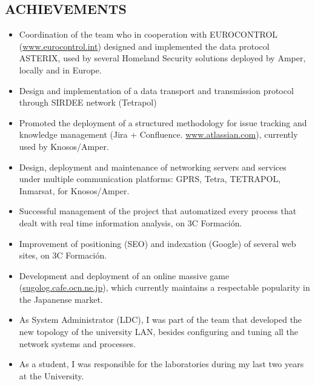 \documentclass[line,margin]{res}
\begin{document}
\begin{resume}
\section{ACHIEVEMENTS}   
                \begin{itemize}  \itemsep 2pt %
                \item Coordination of the team who in cooperation with EUROCONTROL
                (\url{www.eurocontrol.int}) designed and implemented the data
                protocol ASTERIX, used by several Homeland Security solutions 
                deployed by Amper, locally and in Europe.               
                \item Design and implementation of a data transport and transmission 
                protocol through SIRDEE network (Tetrapol)                
                \item Promoted the deployment of a structured methodology for issue
                tracking and knowledge management (Jira + Confluence. 
                \url{www.atlassian.com}), currently used by Knosos/Amper.
                \item Design, deployment and maintenance of networking servers and 
                services under multiple communication platforms: GPRS, Tetra, 
                TETRAPOL, Inmarsat, for Knosos/Amper.
                \item Successful management of the project that automatized 
                every process that dealt with real time information analysis, on 
                3C Formaci\'{o}n.                
                \item Improvement of positioning (SEO) and indexation (Google) of
                several web sites, on 3C Formaci\'{o}n.               
                \item Development and deployment of an online massive game
                (\url{sugolog.cafe.ocn.ne.jp}), which currently maintains
                a respectable popularity in the Japanense market.
                \item As System Administrator (LDC), I was part of the team that 
                developed the new topology of the university LAN, besides configuring
                and tuning all the network systems and processes.
                \item As a student, I was responsible for the laboratories 
                during my last two years at the University.
                \end{itemize}


\end{resume}
\end{document}

